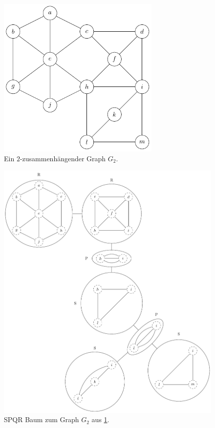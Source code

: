 \begin{figure}[H]
  \centering
  \includegraphics[width=8cm]{bilder/2-Block-Tree1.pdf}
  \caption{Ein $2$-zusammenhängender Graph $G_2$.}
  \label{fig:2-Block-Tree1}
\end{figure}

\begin{figure}[H]
  \centering
  \includegraphics[width=\textwidth,height=\textheight,keepaspectratio]{bilder/SPQR-Tree.pdf}
  \caption{SPQR Baum zum Graph $G_2$ aus \Abb \ref{fig:2-Block-Tree1}.}
  \label{fig:SPQR-Tree}
\end{figure}

